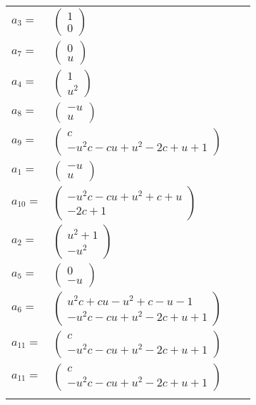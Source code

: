 \documentclass[1p]{elsarticle_modified}
\theoremstyle{definition}
\begin{document}
\begin{tabular}{m{7pt} m{180pt} m{7pt} m{180pt} }
\flushright $a_{3}=$&$\begin{pmatrix}1\\0\end{pmatrix}$ \\
\flushright $a_{7}=$&$\begin{pmatrix}0\\u\end{pmatrix}$ \\
\flushright $a_{4}=$&$\begin{pmatrix}1\\u^2\end{pmatrix}$ \\
\flushright $a_{8}=$&$\begin{pmatrix}- u\\u\end{pmatrix}$ \\
\flushright $a_{9}=$&$\begin{pmatrix}c\\- u^2 c- c u+u^2-2 c+u+1\end{pmatrix}$ \\
\flushright $a_{1}=$&$\begin{pmatrix}- u\\u\end{pmatrix}$ \\
\flushright $a_{10}=$&$\begin{pmatrix}- u^2 c- c u+u^2+c+u\\-2 c+1\end{pmatrix}$ \\
\flushright $a_{2}=$&$\begin{pmatrix}u^2+1\\- u^2\end{pmatrix}$ \\
\flushright $a_{5}=$&$\begin{pmatrix}0\\- u\end{pmatrix}$ \\
\flushright $a_{6}=$&$\begin{pmatrix}u^2 c+c u- u^2+c- u-1\\- u^2 c- c u+u^2-2 c+u+1\end{pmatrix}$ \\
\flushright $a_{11}=$&$\begin{pmatrix}c\\- u^2 c- c u+u^2-2 c+u+1\end{pmatrix}$\\ \flushright $a_{11}=$&$\begin{pmatrix}c\\- u^2 c- c u+u^2-2 c+u+1\end{pmatrix}$\\&\end{tabular}
\end{document}
